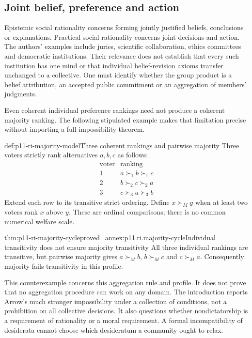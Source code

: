 \subsection{Joint belief, preference and action}

Epistemic social rationality concerns forming jointly justified beliefs,
conclusions or explanations. Practical social rationality concerns
joint decisions and action. The authors' examples include juries,
scientific collaboration, ethics committees and democratic institutions.
Their relevance does not establish that every such institution has
one mind or that individual belief-revision axioms transfer unchanged
to a collective. One must identify whether the group product is a
belief attribution, an accepted public commitment or an aggregation
of members' judgments.

Even coherent individual preference rankings need not produce a
coherent majority ranking. The following stipulated example makes
that limitation precise without importing a full impossibility theorem.

\begin{hbdefinition}{def:p11-ri-majority-model}{Three coherent rankings and pairwise majority}
Three voters strictly rank alternatives \(a,b,c\) as follows:
\[
 \begin{array}{c|c}
 \text{voter}&\text{ranking}\\ \hline
 1&a\succ_1 b\succ_1 c\\
 2&b\succ_2 c\succ_2 a\\
 3&c\succ_3 a\succ_3 b
 \end{array}
\]
Extend each row to its transitive strict ordering. Define
\(x\succ_M y\) when at least two voters rank \(x\) above \(y\).
These are ordinal comparisons; there is no common numerical welfare scale.
\end{hbdefinition}

\begin{hbtheorem}{thm:p11-ri-majority-cycle}{proved=annex:p11.ri.majority-cycle}{Individual transitivity does not ensure majority transitivity}
All three individual rankings are transitive, but pairwise majority gives
\(a\succ_M b\), \(b\succ_M c\) and \(c\succ_M a\).
Consequently majority fails transitivity in this profile.
\end{hbtheorem}

This counterexample concerns this aggregation rule and profile. It does
not prove that no aggregation procedure can work on any domain. The
introduction reports Arrow's much stronger impossibility under a
collection of conditions, not a prohibition on all collective decisions.
It also questions whether nondictatorship is a requirement of rationality
or a moral requirement. A formal incompatibility of desiderata cannot
choose which desideratum a community ought to relax.

